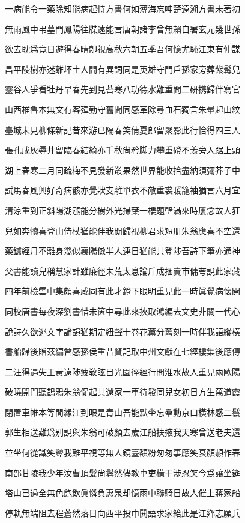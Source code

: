 \documentclass{zhvt-classic-Miya}
\begin{document}
一病能令一藥除知能病起恃方書何如薄海忘呻楚遠溯方書未著初

無雨風中弔墓門鳳陽往牒遠能言唐朝諸李曾無賴自署玄元幾世孫

欲去耽爲竟日遊得春晴卽視高秋六朝五季吾何憶尤恥江東有仲謀

昌平陵樹亦迷離坏土人間有異詞同是英雄守門戶孫家旁葬紫髯兒

靈谷人爭看牡丹早春先到見苔寒八功德水難重問二硏携歸伴寫官

山西椎魯本無文有客殫勤守舊聞同感革除尋血石獨言朱暈起山紋

臺城未見柳條新記昔來游已隔春笑倩夏郎留聚影此行恰得四三人

張孔成灰辱井留臨春結綺亦千秋尙矜脚力攀重磴不羡旁人踞上頭

湖上春寒二月同疏梅不見發新叢果然世界能收拾盡納須彌芥子中

試馬春風興好奇病骸亦覺狀支離單衣不敵重裘暖籠袖猶言六月宜

清涼重到正斜陽湖漲能分樹外光掃葉一樓題壁滿來時屢念故人狂

兒如奔犢喜登山侍杖猶能伴我閒歸視柳君求短册朱翁應喜不空還

藥鑪經月不離身幾似襄陽傚半人連日猶能共登陟吾詩下筆亦通神

父書能讀兒稱慧家計雖廉徑未荒太息論斤成捆賣市傭夸說此家藏

四年前檢雲中集頗喜咸同有此才鐙下眼明重見此一時眞覺病懷開

同校唐書每夜深劉書惜未篋中尋此來挾取鴻編去文史非關一代心

說詩久欲逃文字論韻猶期定紐聲十卷花薰分舊刻一時伴我語縱橫

書船歸後贈茲編曾感孫侯重昔賢記取中州文獻在七經樓集後應傳

二汪得遇失王黃遠陟疲敎眩目光園徑經行問淮水故人重見兩歐陽

破曉開門聽鵲鴉朱翁促起共還家一車待發同兒女初日方生萬道霞

閉置車帷本等閒緣江到眼是青山吾能默坐忘羣動京口橫林感二鬟

郭生相送難爲别說與朱翁可破顏去歲江船扶掖我天寒曾送老夫還

並坐何從識笑顰我難平視等無人鏡臺額粉匆匆事應笑衰顏頳作春

南部甘陵我少年汝曹頂髮尙鬈然儘教車吏橫干涉忍笑今爲讓坐筵

塔山已過全無色飽飲眞憐負惠泉却憶雨中聯騎日故人催上蔣家船

停軌無端阻去程蒼然落日向西平投巾鬨語求家給此是江鄕志願兵
\end{document}
